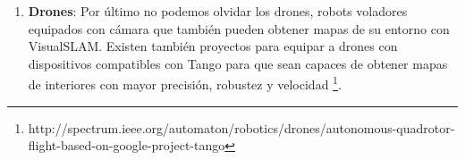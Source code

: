 \begin {enumerate}
\begin{figure}[H]
\begin{center}
\hspace{0.5cm}
\hspace{0.5cm}
\end{center}
\caption{Robot Dyson 360 Eye (a) Robot Roomba 966 (b) Robot Hombot de LG (c).}
\end{figure}

\item \textbf{Drones}: 
Por último no podemos olvidar los drones, robots voladores equipados con cámara que también pueden obtener mapas de su entorno con VisualSLAM. Existen también proyectos para equipar a drones con dispositivos compatibles con Tango para que sean capaces de obtener mapas de interiores con mayor precisión, robustez y velocidad \footnote{http://spectrum.ieee.org/automaton/robotics/drones/autonomous-quadrotor-flight-based-on-google-project-tango}.



\end{enumerate}
